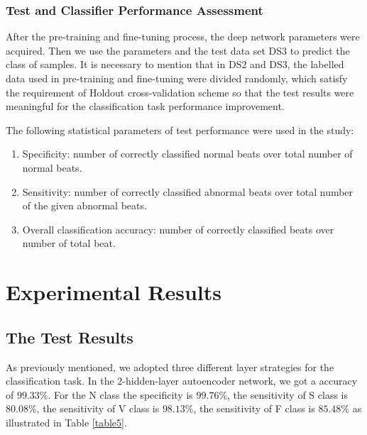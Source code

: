 \documentclass[journal]{IEEEtran}
\begin{document}
\subsubsection{Test and Classifier Performance Assessment}
After the pre-training and fine-tuning process, the deep network parameters were acquired. Then we use the parameters and the test data set DS3 to predict the class of samples. 
It is necessary to mention that in DS2 and DS3, the labelled data used in pre-training and fine-tuning were divided randomly, which satisfy the requirement of Holdout cross-validation scheme so that the test results were meaningful for the classification task performance improvement.

The following statistical parameters of test performance were used in the study:
\begin{enumerate}
\item Specificity: number of correctly classified normal beats over total number of normal beats.
\item Sensitivity: number of correctly classified abnormal beats over total number of the given abnormal beats.
\item Overall classification accuracy: number of correctly classified beats over number of total beat.
\end{enumerate}


\section{Experimental Results}
\subsection{The Test Results}
As previously mentioned, we adopted three different layer strategies for the classification task. 
In the 2-hidden-layer autoencoder network, we got a accuracy of $99.33\%$. For the N class the specificity is $99.76\%$, the sensitivity of S class is $80.08\%$, the sensitivity of V class is $98.13\%$, the sensitivity of F class is $85.48\%$ as illustrated in Table \ref{table5}. 
\end{document}
